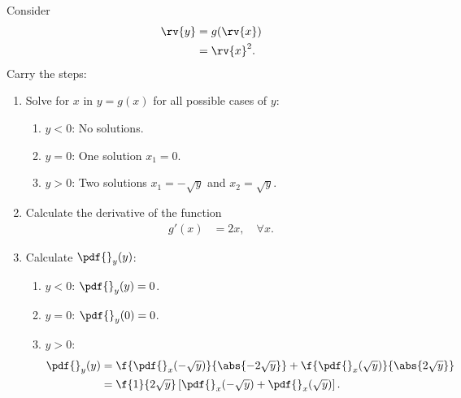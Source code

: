 \begin{example}
    Consider 
    \begin{align}
        \rv{y} 
        &= g(\rv{x})\\
        &= \rv{x}^{2}.
    \end{align}
    Carry the steps:
    \begin{enumerate}
        \item Solve for $x$ in $y=g(x)$ for all possible cases of $y$:
        \begin{enumerate}
            \item $y<0$: No solutions.
            \item $y=0$: One solution $x_{1}=0$.
            \item $y>0$: Two solutions $x_{1}=-\sqrt{y}$ and $x_{2}=\sqrt{y}$.
        \end{enumerate}
        \item Calculate the derivative of the function
        \begin{align}
            g'(x) &= 2x, \quad \forall x.
        \end{align}
        \item Calculate $\pdf{}_{y}(y)$:
        \begin{enumerate}
            \item $y<0$: $\pdf{}_{y}(y) = 0$.
            \item $y=0$: $\pdf{}_{y}(0)=0$.            
            \item $y>0$: 
            \begin{align}
                \pdf{}_{y}(y) &= \f{\pdf{}_{x}(-\sqrt{y})}{\abs{-2\sqrt{y}}} + \f{\pdf{}_{x}(\sqrt{y})}{\abs{2\sqrt{y}}}\\
                &= \f{1}{2\sqrt{y}}\left[ \pdf{}_{x}(-\sqrt{y}) + \pdf{}_{x}(\sqrt{y}) \right].
            \end{align}
        \end{enumerate}
    \end{enumerate}
    \triqed
\end{example}


